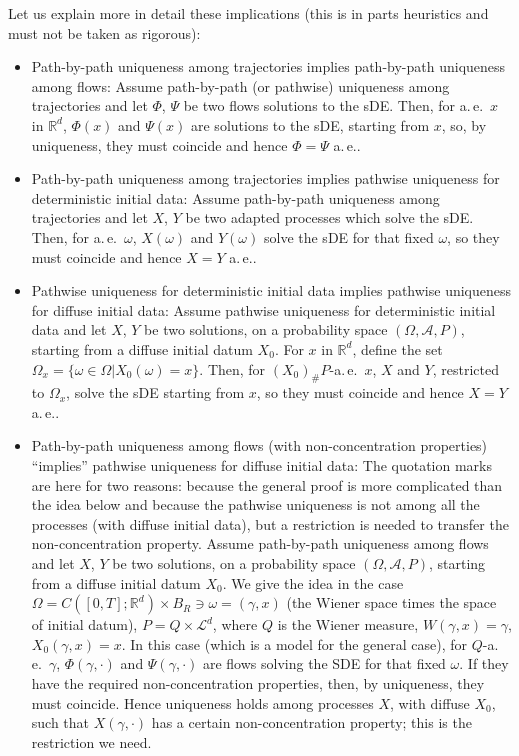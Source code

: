 \documentclass[a4paper,10pt]{article}
\newcommand{\mr}{\mathbb{R}}
\newcommand{\mc}{\mathcal}
\begin{document}
Let us explain more in detail these implications (this is in parts heuristics and must not be taken as rigorous):
\begin{itemize}
\item Path-by-path uniqueness among trajectories implies path-by-path uniqueness among flows: Assume path-by-path (or pathwise) uniqueness among trajectories and let $\Phi$, $\Psi$ be two flows solutions to the sDE. Then, for a.\,e.\ $x$ in $\mr^d$, $\Phi(x)$ and $\Psi(x)$ are solutions to the sDE, starting from $x$, so, by uniqueness, they must coincide and hence $\Phi=\Psi$ a.\,e..
\item Path-by-path uniqueness among trajectories implies pathwise uniqueness for deterministic initial data: Assume path-by-path uniqueness among trajectories and let $X$, $Y$ be two adapted processes which solve the sDE. Then, for a.\,e.\ $\omega$, $X(\omega)$ and $Y(\omega)$ solve the sDE for that fixed $\omega$, so they must coincide and hence $X=Y$ a.\,e..
\item Pathwise uniqueness for deterministic initial data implies pathwise uniqueness for diffuse initial data: Assume pathwise uniqueness for deterministic initial data and let $X$, $Y$ be two solutions, on a probability space $(\Omega,\mc{A},P)$, starting from a diffuse initial datum $X_0$. For $x$ in $\mr^d$, define the set $\Omega_x=\{\omega\in\Omega|X_0(\omega)=x\}$. Then, for $(X_0)_\#P$-a.\,e.\ $x$, $X$ and $Y$, restricted to $\Omega_x$, solve the sDE starting from $x$, so they must coincide and hence $X=Y$ a.\,e..
\item Path-by-path uniqueness among flows (with non-concentration properties) ``implies'' pathwise uniqueness for diffuse initial data: The quotation marks are here for two reasons: because the general proof is more complicated than the idea below and because the pathwise uniqueness is not among all the processes (with diffuse initial data), but a restriction is needed to transfer the non-concentration property. Assume path-by-path uniqueness among flows and let $X$, $Y$ be two solutions, on a probability space $(\Omega,\mc{A},P)$, starting from a diffuse initial datum $X_0$. We give the idea in the case $\Omega=C([0,T];\mr^d)\times B_R\ni\omega=(\gamma,x)$ (the Wiener space times the space of initial datum), $P=Q\times\mc{L}^d$, where $Q$ is the Wiener measure, $W(\gamma,x)=\gamma$, $X_0(\gamma,x)=x$. In this case (which is a model for the general case), for $Q$-a.\,e.\ $\gamma$, $\Phi(\gamma,\cdot)$ and $\Psi(\gamma,\cdot)$ are flows solving the SDE for that fixed $\omega$. If they have the required 
non-concentration properties, then, by uniqueness, they must coincide. Hence uniqueness holds among processes $X$, with diffuse $X_0$, such that $X(\gamma,\cdot)$ has a certain non-concentration property; this is the restriction we need.
\end{itemize}
\end{document}
